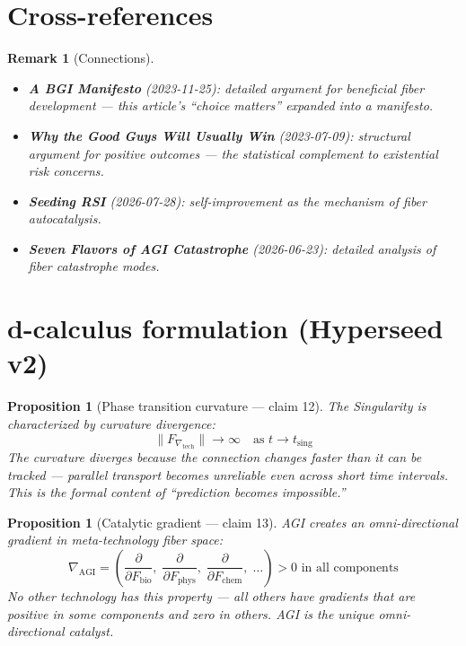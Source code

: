 \documentclass[11pt,a4paper]{article}
\newtheorem{proposition}[definition]{Proposition}
\newtheorem{remark}[definition]{Remark}
\begin{document}
\section{Cross-references}

\begin{remark}[Connections]
\begin{itemize}
\item \textbf{A BGI Manifesto} (2023-11-25): detailed argument for
  beneficial fiber development --- this article's ``choice matters''
  expanded into a manifesto.
\item \textbf{Why the Good Guys Will Usually Win} (2023-07-09): structural
  argument for positive outcomes --- the statistical complement to
  existential risk concerns.
\item \textbf{Seeding RSI} (2026-07-28): self-improvement as the mechanism
  of fiber autocatalysis.
\item \textbf{Seven Flavors of AGI Catastrophe} (2026-06-23): detailed
  analysis of fiber catastrophe modes.
\end{itemize}
\end{remark}

\section{d-calculus formulation (Hyperseed v2)}

\begin{proposition}[Phase transition curvature --- claim 12]
\label{prop:curvature}
The Singularity is characterized by curvature divergence:
\[
  \|F_{\nabla_{\text{tech}}}\| \to \infty \quad \text{as } t \to t_{\text{sing}}
\]
The curvature diverges because the connection changes faster than it can
be tracked --- parallel transport becomes unreliable even across short
time intervals. This is the formal content of ``prediction becomes
impossible.''
\end{proposition}

\begin{proposition}[Catalytic gradient --- claim 13]
\label{prop:gradient}
AGI creates an omni-directional gradient in meta-technology fiber space:
\[
  \nabla_{\text{AGI}} = \left(\frac{\partial}{\partial F_{\text{bio}}},\;
    \frac{\partial}{\partial F_{\text{phys}}},\;
    \frac{\partial}{\partial F_{\text{chem}}},\; \ldots\right) > 0
    \text{ in all components}
\]
No other technology has this property --- all others have gradients
that are positive in some components and zero in others. AGI is the
unique omni-directional catalyst.
\end{proposition}
\end{document}
